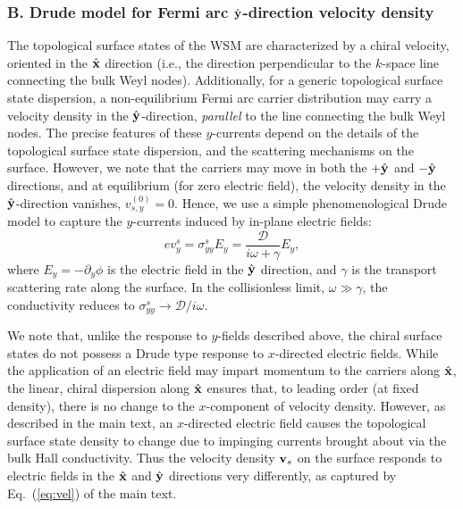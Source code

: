 \documentclass[aps,twocolumn,prl,groupedaddress]{revtex4}
\newcommand{\be}{\begin{equation}}
\newcommand{\ee}{\end{equation}}
\renewcommand{\vec}[1]{{\bf #1}}
\begin{document}
\subsubsection{B. Drude model for Fermi arc $\hat{\vec{y}}$-direction velocity density}
The topological surface states of the WSM are characterized by a chiral velocity, oriented in the $\hat{\vec{x}}$ direction (i.e., the direction perpendicular to the $k$-space line connecting the bulk Weyl nodes). 
Additionally, for a generic topological surface state dispersion, a non-equilibrium Fermi arc carrier distribution may carry a velocity density in the $\hat{\vec{y}}$-direction, {\it parallel} to the line connecting the bulk Weyl nodes.
The precise features of these $y$-currents depend 
on the details of the topological surface state dispersion, and the scattering mechanisms on the surface. 
However, we note that the carriers may move in both the $+\hat{\vec{y}}$ and $-\hat{\vec{y}}$ directions, and at equilibrium (for zero electric field), the velocity density in the $\hat{\vec{y}}$-direction vanishes, $v_{s,y}^{(0)} =0$. 
Hence, 
we use a simple phenomenological Drude model to capture the $y$-currents induced by in-plane electric fields: 
\be
e v_y^s = \sigma_{yy}^s E_y = \frac{\mathcal{D}}{i\omega + \gamma} E_y, 
\ee
where $E_y = -\partial_y \phi$ is the electric field in the $\hat{\vec{y}}$ direction, and $\gamma$ is the transport scattering rate along the surface. 
In the collisionless limit, $\omega \gg \gamma$, the conductivity reduces to $ \sigma_{yy}^s \to \mathcal{D}/i \omega$. 

We note that, unlike the response to $y$-fields described above, 
the chiral surface states do not possess a Drude type response to $x$-directed electric fields. 
While the application of an electric field may impart momentum to the carriers along $\hat{\vec{x}}$, the linear, chiral dispersion along $\hat{\vec{x}}$ ensures that, to leading order (at fixed density), there is no change to the $x$-component of velocity density. 
However, as described in the main text, an $x$-directed electric field causes the topological surface state density to change due to impinging currents brought about via the bulk Hall conductivity.
Thus the velocity density $\vec{v}_s$ on the surface responds to electric fields in the $\hat{\vec{x}}$ and $\hat{\vec{y}}$ directions very differently, as captured by Eq.~(\ref{eq:vel}) of the main text.

\end{document}
